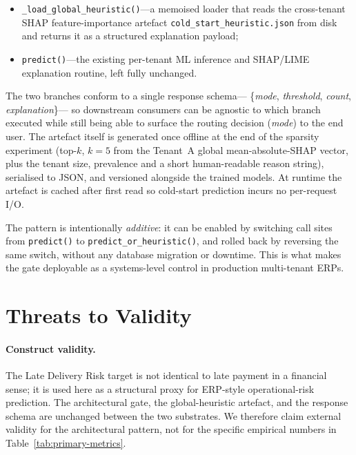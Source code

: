 \documentclass[conference]{IEEEtran}
\begin{document}
\begin{itemize}
  \item \texttt{\_load\_global\_heuristic()}---a memoised loader that
        reads the cross-tenant SHAP feature-importance artefact
        \texttt{cold\_start\_heuristic.json} from disk and returns it
        as a structured explanation payload;
  \item \texttt{predict()}---the existing per-tenant ML inference and
        SHAP/LIME explanation routine, left fully unchanged.
\end{itemize}

The two branches conform to a single response schema---
\{\textit{mode}, \textit{threshold}, \textit{count}, \textit{explanation}\}---%
so downstream consumers can be agnostic to which branch executed while
still being able to surface the routing decision (\textit{mode}) to the
end user. The artefact itself is generated once offline at the end of
the sparsity experiment (top-$k$, $k = 5$ from the Tenant~A global
mean-absolute-SHAP vector, plus the tenant size, prevalence and a short
human-readable reason string), serialised to JSON, and versioned
alongside the trained models. At runtime the artefact is cached after
first read so cold-start prediction incurs no per-request I/O.

The pattern is intentionally \emph{additive}: it can be enabled by
switching call sites from \texttt{predict()} to
\texttt{predict\_or\_heuristic()}, and rolled back by reversing the same
switch, without any database migration or downtime. This is what makes
the gate deployable as a systems-level control in production
multi-tenant ERPs.

\section{Threats to Validity}
\label{sec:threats}

\paragraph*{Construct validity.} The Late Delivery Risk target is not
identical to late payment in a financial sense; it is used here as a
structural proxy for ERP-style operational-risk prediction. The
architectural gate, the global-heuristic artefact, and the response
schema are unchanged between the two substrates. We therefore claim
external validity for the architectural pattern, not for the specific
empirical numbers in Table~\ref{tab:primary-metrics}.
\end{document}
